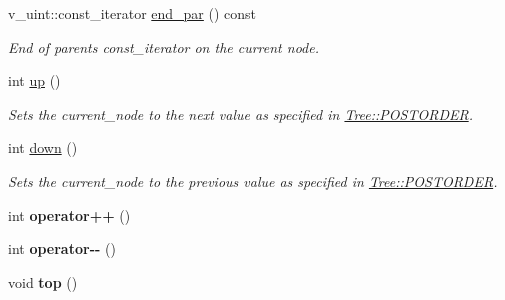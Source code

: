 \begin{DoxyCompactItemize}
\mbox{\label{classpruner_1_1TreeIterator_aec582d1a4bf6b892532d41f1f9b8044d}} 
v\+\_\+uint\+::const\+\_\+iterator \hyperlink{classpruner_1_1TreeIterator_aec582d1a4bf6b892532d41f1f9b8044d}{end\+\_\+par} () const
\begin{DoxyCompactList}\small\item\em End of parents {\ttfamily const\+\_\+iterator} on the current node. \end{DoxyCompactList}\item 
\mbox{\label{classpruner_1_1TreeIterator_af7f80d5909938115bf9e6455ac8950b3}} 
int \hyperlink{classpruner_1_1TreeIterator_af7f80d5909938115bf9e6455ac8950b3}{up} ()
\begin{DoxyCompactList}\small\item\em Sets the {\ttfamily current\+\_\+node} to the next value as specified in \hyperlink{classpruner_1_1Tree_aa93805054bcd43cca478cc5a825bc99a}{Tree\+::\+P\+O\+S\+T\+O\+R\+D\+ER}. \end{DoxyCompactList}\item 
\mbox{\label{classpruner_1_1TreeIterator_a0f6bb45c1293ffee50e01fbb9c8a2851}} 
int \hyperlink{classpruner_1_1TreeIterator_a0f6bb45c1293ffee50e01fbb9c8a2851}{down} ()
\begin{DoxyCompactList}\small\item\em Sets the {\ttfamily current\+\_\+node} to the previous value as specified in \hyperlink{classpruner_1_1Tree_aa93805054bcd43cca478cc5a825bc99a}{Tree\+::\+P\+O\+S\+T\+O\+R\+D\+ER}. \end{DoxyCompactList}\item 
\mbox{\label{classpruner_1_1TreeIterator_af29b9c5dfd5af02ad768bc5877e5b34f}} 
int {\bfseries operator++} ()
\item 
\mbox{\label{classpruner_1_1TreeIterator_a49bfa22ba8b2ac81a4bfde6144133f60}} 
int {\bfseries operator-\/-\/} ()
\item 
\mbox{\label{classpruner_1_1TreeIterator_a255656cbdc38f6141292c068cda4f3bf}} 
void {\bfseries top} ()
\item 
\mbox{\label{classpruner_1_1TreeIterator_a6c23acfa08f071df762a3c82b05ae0af}} 

\end{DoxyCompactItemize}

